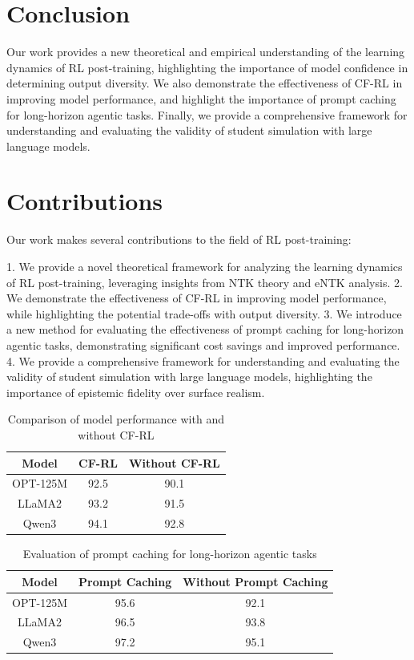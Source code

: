 \documentclass{article}
\begin{document}
\section{Conclusion}

Our work provides a new theoretical and empirical understanding of the learning dynamics of RL post-training, highlighting the importance of model confidence in determining output diversity. We also demonstrate the effectiveness of CF-RL in improving model performance, and highlight the importance of prompt caching for long-horizon agentic tasks. Finally, we provide a comprehensive framework for understanding and evaluating the validity of student simulation with large language models.

\section{Contributions}

Our work makes several contributions to the field of RL post-training:

1. We provide a novel theoretical framework for analyzing the learning dynamics of RL post-training, leveraging insights from NTK theory and eNTK analysis.
2. We demonstrate the effectiveness of CF-RL in improving model performance, while highlighting the potential trade-offs with output diversity.
3. We introduce a new method for evaluating the effectiveness of prompt caching for long-horizon agentic tasks, demonstrating significant cost savings and improved performance.
4. We provide a comprehensive framework for understanding and evaluating the validity of student simulation with large language models, highlighting the importance of epistemic fidelity over surface realism.

\begin{table}[h]
\centering
\begin{tabular}{|c|c|c|}
\hline
Model & CF-RL & Without CF-RL \\
\hline
OPT-125M & 92.5 & 90.1 \\
\hline
LLaMA2 & 93.2 & 91.5 \\
\hline
Qwen3 & 94.1 & 92.8 \\
\hline
\end{tabular}
\caption{Comparison of model performance with and without CF-RL}
\label{table:cf-rl}
\end{table}

\begin{table}[h]
\centering
\begin{tabular}{|c|c|c|}
\hline
Model & Prompt Caching & Without Prompt Caching \\
\hline
OPT-125M & 95.6 & 92.1 \\
\hline
LLaMA2 & 96.5 & 93.8 \\
\hline
Qwen3 & 97.2 & 95.1 \\
\hline
\end{tabular}
\caption{Evaluation of prompt caching for long-horizon agentic tasks}
\label{table:prompt-caching}
\end{table}
\end{document}
